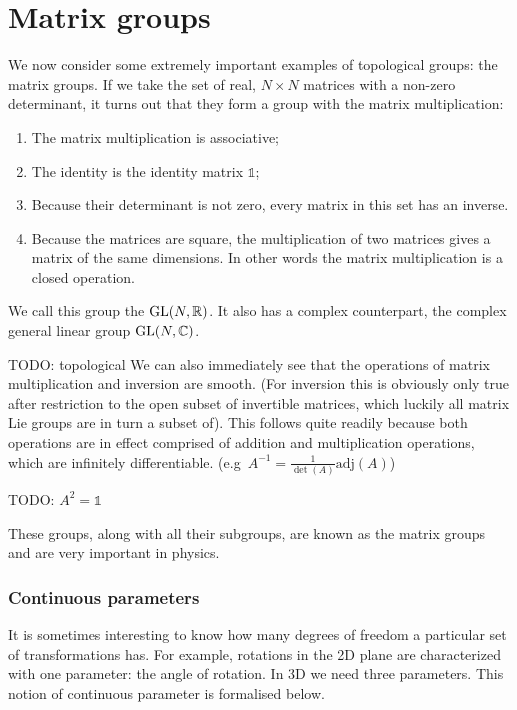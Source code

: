 \section{Matrix groups}
We now consider some extremely important examples of topological groups: the matrix groups.
If we take the set of real, $N\times N$ matrices with a non-zero determinant, it turns out that they form a group with the matrix multiplication:
\begin{enumerate}
\item The matrix multiplication is associative;
\item The identity is the identity matrix $\mathbb{1}$;
\item Because their determinant is not zero, every matrix in this set has an inverse.
\item Because the matrices are square, the multiplication of two matrices gives a matrix of the same dimensions. In other words the matrix multiplication is a closed operation.
\end{enumerate}
We call this group the  $\operatorname{GL}(N, \mathbb{R})$. It also has a complex counterpart, the complex general linear group $\operatorname{GL}(N, \mathbb{C})$.

TODO: topological
We can also immediately see that the operations of matrix multiplication and inversion are smooth. (For inversion this is obviously only true after restriction to the open subset of invertible matrices, which luckily all matrix Lie groups are in turn a subset of). This follows quite readily because both operations are in effect comprised of addition and multiplication operations, which are infinitely differentiable. (e.g\ $A^{-1} = \frac{1}{\det(A)}\mathrm{adj}(A)$)

\begin{example}
TODO: $A^2 = \mathbb{1}$
\end{example}

These groups, along with all their subgroups, are known as the matrix groups and are very important in physics.

\subsubsection{Continuous parameters}
It is sometimes interesting to know how many degrees of freedom a particular set of transformations has. For example, rotations in the 2D plane are characterized with one parameter: the angle of rotation. In 3D we need three parameters. This notion of continuous parameter is formalised below.

